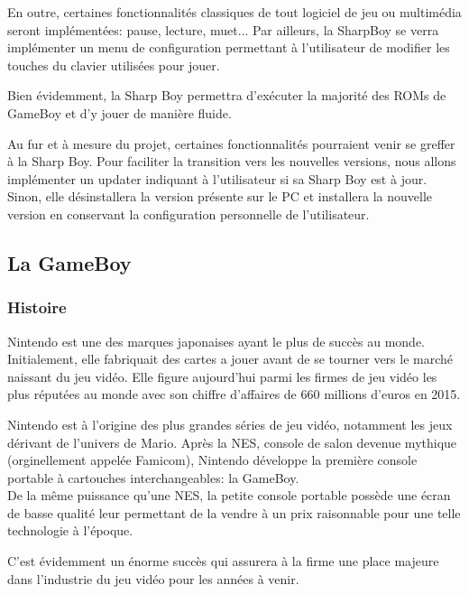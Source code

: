\documentclass[12pt, a4paper]{article}
\begin{document}
En outre, certaines fonctionnalités classiques de tout logiciel de jeu ou multimédia seront implémentées: pause, lecture, muet... Par ailleurs, la SharpBoy se verra implémenter un menu de configuration permettant à l'utilisateur de modifier les touches du clavier utilisées pour jouer.
\medskip

Bien évidemment, la Sharp Boy permettra d'exécuter la majorité des ROMs de GameBoy et d'y jouer de manière fluide.
\medskip

Au fur et à mesure du projet, certaines fonctionnalités pourraient venir se greffer à la Sharp Boy. Pour faciliter la transition vers les nouvelles versions, nous allons implémenter un updater indiquant à l'utilisateur si sa Sharp Boy est à jour. Sinon, elle désinstallera la version présente sur le PC et installera la nouvelle version en conservant la configuration personnelle de l'utilisateur.

\pagebreak
\subsection{La GameBoy}

\subsubsection{Histoire}

Nintendo est une des marques japonaises ayant le plus de succès au monde. Initialement, elle fabriquait des cartes a jouer avant de se tourner vers le marché naissant du jeu vidéo. Elle figure aujourd'hui parmi les firmes de jeu vidéo les plus réputées au monde avec son chiffre d'affaires de 660 millions d'euros en 2015.
\medskip

Nintendo est à l'origine des plus grandes séries de jeu vidéo, notamment les jeux dérivant de l'univers de Mario. Après la NES, console de salon devenue mythique (orginellement appelée Famicom), Nintendo développe la première console portable à cartouches interchangeables: la GameBoy. \\
De la même puissance qu'une NES, la petite console portable possède une écran de basse qualité leur permettant de la vendre à un prix raisonnable pour une telle technologie à l'époque.
\medskip

C'est évidemment un énorme succès qui assurera à la firme une place majeure dans l'industrie du jeu vidéo pour les années à venir.
\end{document}
